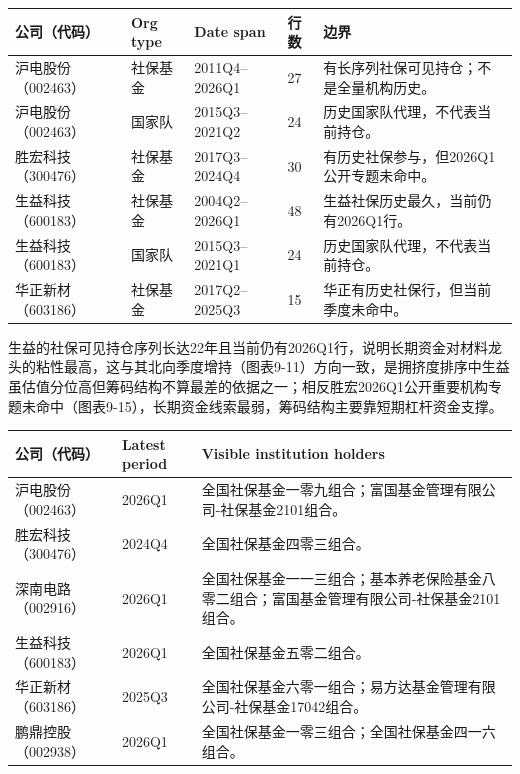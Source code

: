 \begin{exhibitbox}
\footnotesize
\begin{tabularx}{\textwidth}{L{1.8cm}L{1.8cm}L{2.4cm}R{1.5cm}X}
\toprule
\textbf{公司（代码）} & \textbf{Org type} & \textbf{Date span} & \textbf{行数} & \textbf{边界} \\
\midrule
沪电股份（002463） & 社保基金 & 2011Q4--2026Q1 & 27 & 有长序列社保可见持仓；不是全量机构历史。 \\
沪电股份（002463） & 国家队 & 2015Q3--2021Q2 & 24 & 历史国家队代理，不代表当前持仓。 \\
胜宏科技（300476） & 社保基金 & 2017Q3--2024Q4 & 30 & 有历史社保参与，但2026Q1公开专题未命中。 \\
生益科技（600183） & 社保基金 & 2004Q2--2026Q1 & 48 & 生益社保历史最久，当前仍有2026Q1行。 \\
生益科技（600183） & 国家队 & 2015Q3--2021Q1 & 24 & 历史国家队代理，不代表当前持仓。 \\
华正新材（603186） & 社保基金 & 2017Q2--2025Q3 & 15 & 华正有历史社保行，但当前季度未命中。 \\
\bottomrule
\end{tabularx}
\end{exhibitbox}

生益的社保可见持仓序列长达22年且当前仍有2026Q1行，说明长期资金对材料龙头的粘性最高，这与其北向季度增持（图表9-11）方向一致，是拥挤度排序中生益虽估值分位高但筹码结构不算最差的依据之一；相反胜宏2026Q1公开重要机构专题未命中（图表9-15），长期资金线索最弱，筹码结构主要靠短期杠杆资金支撑。

\begin{exhibitbox}
\footnotesize
\begin{tabularx}{\textwidth}{L{1.8cm}L{2.2cm}X}
\toprule
\textbf{公司（代码）} & \textbf{Latest period} & \textbf{Visible institution holders} \\
\midrule
沪电股份（002463） & 2026Q1 & 全国社保基金一零九组合；富国基金管理有限公司-社保基金2101组合。 \\
胜宏科技（300476） & 2024Q4 & 全国社保基金四零三组合。 \\
深南电路（002916） & 2026Q1 & 全国社保基金一一三组合；基本养老保险基金八零二组合；富国基金管理有限公司-社保基金2101组合。 \\
生益科技（600183） & 2026Q1 & 全国社保基金五零二组合。 \\
华正新材（603186） & 2025Q3 & 全国社保基金六零一组合；易方达基金管理有限公司-社保基金17042组合。 \\
鹏鼎控股（002938） & 2026Q1 & 全国社保基金一零三组合；全国社保基金四一六组合。 \\
\bottomrule
\end{tabularx}
\end{exhibitbox}

